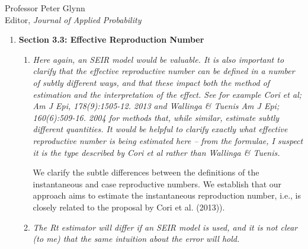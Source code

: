 \documentclass[11pt]{letter} %
\begin{document}
\begin{letter}{Professor
	Peter Glynn\\
	Editor, {\em Journal of Applied Probability}}
\begin{enumerate}
\begin{enumerate}
	The SIR model in Section 3.2 is replaced by the SEIR model.  We highlight that the SEIR model has been shown to better represent the SARS-CoV-2 dynamics.  Figure 3a presents updated versions of the potential bias in ratio estimators under an SEIR model.   The conclusion remains largely the same. The only difference from the prior manuscript is that the peak in bias prior to the ratio going less than 1 is less pronounced (prior submission with SIR model has an approximate peak of 5 while current manuscript has approximate peak of 2).
	\vspace{5mm}
\end{enumerate}
\item {\bf Section 3.3: Effective Reproduction Number}
\begin{enumerate}
	\item {\it Here again, an SEIR model would be valuable. It is also important to clarify that the effective reproductive number can be defined in a number of subtly different ways, and that these impact both the method of estimation and the interpretation of the effect. See for example Cori et al; Am J Epi, 178(9):1505-12. 2013 and Wallinga \& Tuenis Am J Epi; 160(6):509-16. 2004 for methods that, while similar, estimate subtly different quantities. It would be helpful to clarify exactly what effective reproductive number is being estimated here – from the formulae, I suspect it is the type described by Cori et al rather than Wallinga \& Tuenis.}
	\vspace{5mm}

	We clarify the subtle differences between the definitions of the instantaneous and case reproductive numbers.  We establish that our approach aims to estimate the instantaneous reproduction number, i.e., is closely related to the proposal by Cori et al. (2013)).

	\vspace{5mm}
	\item {\it The Rt estimator will differ if an SEIR model is used, and it is not clear (to me) that the same intuition about the error will hold.}
	\vspace{5mm}



\end{enumerate}
\end{enumerate}
\end{letter}
\end{document}
